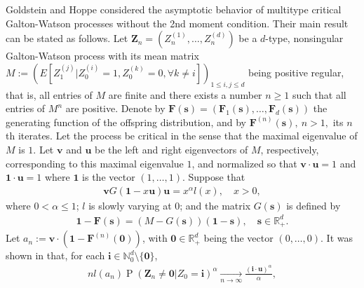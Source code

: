 \documentclass[12pt,a4paper]{amsart}
\theoremstyle{definition}
\numberwithin{equation}{section}
\begin{document}
Goldstein and Hoppe \cite{GoldsteinHoppe1978Critical} considered the asymptotic behavior of multitype critical Galton-Watson processes without the 2nd moment
condition. Their main result can be stated as follows.
Let $\mathbf Z_n=(Z_n^{(1)}, \dots, Z_n^{(d)})$ be a $d$-type, nonsingular Galton-Watson process with its mean matrix $M:= (E[Z_1^{(j)}| Z_0^{(i)} = 1, Z_0^{(k)} = 0, \forall k \neq i])_{1\leq i,j\leq d}$ being positive regular, that is, all entries of $M$ are finite and there exists a number $n \geq 1$ such that all entries of $M^n$ are positive.
Denote by $\mathbf F(\mathbf s) = (\mathbf F_1(\mathbf s), \dots, \mathbf F_d(\mathbf s))$ the generating function of the offspring distribution, and by $\mathbf F^{(n)}(\mathbf s), ~ n>1,$ its $n$th iterates.
Let the process be critical in the sense that the maximal eigenvalue of $M$ is $1$. 
Let $\mathbf v$ and $\mathbf u$ be the left and right  eigenvectors of $M$, respectively, corresponding to this maximal eigenvalue $1$, and normalized so that $\mathbf v \cdot \mathbf u = 1$ and $\mathbf 1 \cdot \mathbf u = 1$ where $\mathbf 1$ is the vector $(1,\dots, 1)$.
Suppose that
\begin{align}
  \label{eq: regularly varying condition for multitype branching process}
	\mathbf v G(\mathbf 1-x\mathbf u) \mathbf u
	= x^\alpha l(x),
	\quad x > 0,
\end{align}
where $0 < \alpha \leq 1$; 
$l$ is slowly varying at $0$;
and the matrix $G(\mathbf s)$ is defined by
\begin{align}
	\mathbf 1 - \mathbf F(\mathbf s)
	= (M - G(\mathbf s))(\mathbf 1 - \mathbf s),
	\quad \mathbf s \in \mathbb R_+^d.
\end{align}
Let $a_n := \mathbf v \cdot (\mathbf 1 - \mathbf F^{(n)}(\mathbf 0))$, with $\mathbf 0 \in \mathbb R_+^d$ being the vector $(0,\dots, 0)$.
It was shown in \cite{GoldsteinHoppe1978Critical} that, for each $\mathbf i \in \mathbb N_0^d \setminus \{\mathbf 0\}$,
\begin{align} 
  \label{eq: limit behavior of the exitinction probability without finite variance of multitype branching processes}
  n l(a_n)
	\operatorname{P}(\mathbf Z_n \neq \mathbf 0| Z_0 = \mathbf i)^\alpha
	\xrightarrow[n\to \infty]{}
	\frac{(\mathbf i \cdot \mathbf u)^\alpha}\alpha,
\end{align}
\end{document}

